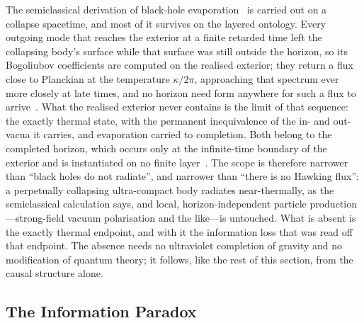 \documentclass[11pt,a4paper]{article}
\theoremstyle{plain}
\theoremstyle{definition}
\theoremstyle{remark}
\begin{document}
The semiclassical derivation of black-hole evaporation~\cite{Hawking1975} is carried out on a collapse spacetime, and most of it survives on the layered ontology. Every outgoing mode that reaches the exterior at a finite retarded time left the collapsing body's surface while that surface was still outside the horizon, so its Bogoliubov coefficients are computed on the realised exterior; they return a flux close to Planckian at the temperature $\kappa/2\pi$, approaching that spectrum ever more closely at late times, and no horizon need form anywhere for such a flux to arrive~\cite{Barcelo2011,JanzenBHcausality}. What the realised exterior never contains is the limit of that sequence: the exactly thermal state, with the permanent inequivalence of the in- and out-vacua it carries, and evaporation carried to completion. Both belong to the completed horizon, which occurs only at the infinite-time boundary of the exterior and is instantiated on no finite layer~\cite{JanzenBHcausality}. The scope is therefore narrower than ``black holes do not radiate'', and narrower than ``there is no Hawking flux'': a perpetually collapsing ultra-compact body radiates near-thermally, as the semiclassical calculation says, and local, horizon-independent particle production---strong-field vacuum polarisation and the like---is untouched. What is absent is the exactly thermal endpoint, and with it the information loss that was read off that endpoint. The absence needs no ultraviolet completion of gravity and no modification of quantum theory; it follows, like the rest of this section, from the causal structure alone.

\subsection{The Information Paradox}\label{sec:CR-information}
\end{document}
